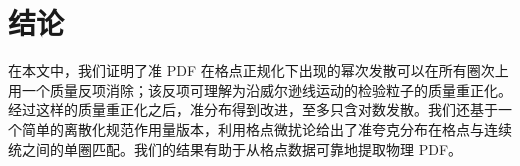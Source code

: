 \section{结论}

在本文中，我们证明了准 PDF 在格点正规化下出现的幂次发散可以在所有圈次上用一个质量反项消除；该反项可理解为沿威尔逊线运动的检验粒子的质量重正化。经过这样的质量重正化之后，准分布得到改进，至多只含对数发散。我们还基于一个简单的离散化规范作用量版本，利用格点微扰论给出了准夸克分布在格点与连续统之间的单圈匹配。我们的结果有助于从格点数据可靠地提取物理 PDF。
